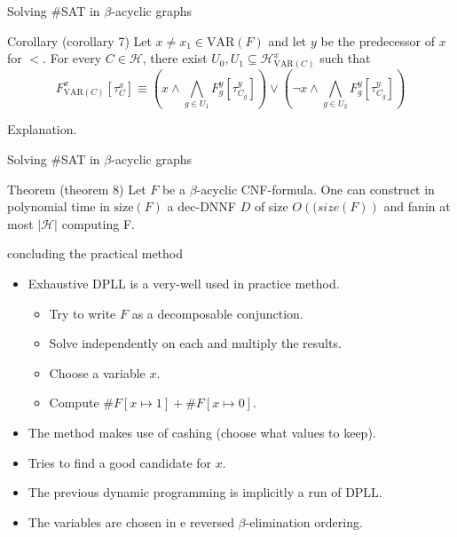 \begin{frame}[t]{Solving \#SAT in $\beta$-acyclic graphs}
	\begin{block}{Corollary (corollary 7)}
		Let $x \neq x_1 \in \mathrm{VAR}(F)$ and let $y$ be the predecessor of $x$ for $<$. For every $C \in \mathcal{H}$, there exist $U_0, U_1 \subseteq \mathcal{H}^x_{\mathrm{VAR}(C)}$ such that
		$$F^x_{\mathrm{VAR}(C)}[\tau^x_C] \equiv 
		( x \land \bigwedge\limits_{g \in U_1} F^y_g[\tau^y_{C_g}]) \lor
		( \lnot x \land \bigwedge\limits_{g \in U_2} F^y_g[\tau^y_{C_g}])
		$$
	\end{block}
	Explanation.
\end{frame}

\begin{frame}[t]{Solving \#SAT in $\beta$-acyclic graphs}
	\begin{block}{Theorem (theorem 8)}
		Let $F$ be a $\beta$-acyclic CNF-formula. One can construct in polynomial time in $\mathrm{size}(F)$ a dec-DNNF $D$ of size $O(\mathrm(size(F))$ and fanin at most $|\mathcal{H}|$ computing F.
	\end{block}
\end{frame}

\begin{frame}[t]{concluding the practical method}
	\begin{itemize}[<+->]
		\item Exhaustive DPLL is a very-well used in practice method.
			\begin{itemize}
				\item Try to write $F$ as a decomposable conjunction. 
				\item[] \hspace{1cm}Solve independently on each and multiply the results.
				\item Choose a variable $x$.
				\item[] \hspace{1cm}Compute $\#F[x\mapsto 1] + \#F[x\mapsto 0]$.
			\end{itemize}
		\item The method makes use of cashing (choose what values to keep).
		\item Tries to find a good candidate for $x$.
		\item The previous dynamic programming is implicitly a run of DPLL. 
		\item The variables are chosen in e reversed $\beta$-elimination ordering. 
	\end{itemize}
\end{frame}
